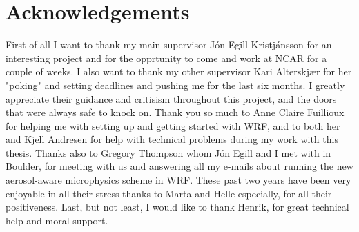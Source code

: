 \section*{Acknowledgements}

First of all I want to thank my main supervisor Jón Egill Kristjánsson for an interesting project and for the opprtunity to come and work at NCAR for a couple of weeks. I also want to thank my other supervisor Kari Alterskjær for her "poking" and setting deadlines and pushing me for the last six months. I greatly appreciate their guidance and critisism throughout this project, and the doors that were always safe to knock on. 
Thank you so much to Anne Claire Fuillioux for helping me with setting up and getting started with WRF, and to both her and Kjell Andresen for help with technical problems during my work with this thesis.
Thanks also to Gregory Thompson whom Jón Egill and I met with in Boulder, for meeting with us and answering all my e-mails about running the new aerosol-aware microphysics scheme in WRF.
These past two years have been very enjoyable in all their stress thanks to Marta and Helle especially, for all their positiveness.
Last, but not least, I would like to thank Henrik, for great technical help and moral support.